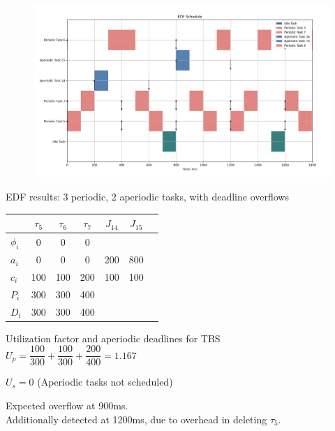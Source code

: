 \documentclass[10pt]{beamer}
\begin{document}
\begin{frame}
	\begin{figure}
		\centerline{\includegraphics[scale = 0.25]{figures/Ex8_3P_2AP.png}}
		\label{Fig8}
	\end{figure}
\end{frame}

\begin{frame}{\small{EDF results: 3 periodic, 2 aperiodic tasks, with deadline overflows}}
	\footnotesize{
	\begin{table}[ht]\label{table10}
		\hskip-5.0cm\begin{tabular}{lcccccl}\toprule
		\hline
		 & ${\tau_{5}}$ & ${\tau_{6}}$ & ${\tau_{7}}$& ${J_{14}}$ & ${J_{15}}$\\\midrule
		\hline
		${\phi_{i}}$ & 0 & 0 & 0 &  & \\
		$a_{i}$ & 0 & 0 & 0 & 200 & 800\\
		$c_{i}$ & 100 & 100 & 200 & 100 & 100\\
		$P_{i}$ & 300 & 300 & 400 \\
		$D_{i}$ & 300 & 300 & 400 \\\bottomrule
		\hline
	\end{tabular}
\end{table}

Utilization factor and aperiodic deadlines for TBS\\
\hfill\break
$U_{p} = \dfrac{100}{300} + \dfrac{100}{300} + \dfrac{200}{400} = 1.167$

\hfill\break
$U_{s} = 0$ (Aperiodic tasks not scheduled)\\
\hfill\break

Expected overflow at 900ms.\\
Additionally detected at 1200ms, due to overhead in deleting ${\tau_{5}}$.

}
\end{frame}
\end{document}
